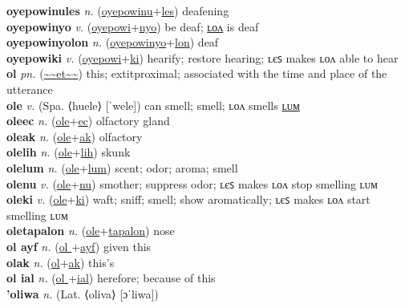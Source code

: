 \textbf{oyepowinules} \textit{n.} (\hyperref[oyepowinu]{oyepowinu}+\hyperref[les]{les})
deafening \label{oyepowinules} \\
\textbf{oyepowinyo} \textit{v.} (\hyperref[oyepowi]{oyepowi}+\hyperref[nyo]{nyo})
be deaf; \hyperref[oyepowinyolon]{ʟᴏᴧ} is deaf \label{oyepowinyo} \\
\textbf{oyepowinyolon} \textit{n.} (\hyperref[oyepowinyo]{oyepowinyo}+\hyperref[lon]{lon})
deaf \label{oyepowinyolon} \\
\textbf{oyepowiki} \textit{v.} (\hyperref[oyepowi]{oyepowi}+\hyperref[ki]{ki})
hearify; restore hearing; ʟєꜱ makes ʟᴏᴧ able to hear \label{oyepowiki} \\
\textbf{ol} \textit{pn.} (\hyperref[et]{\~{}\~{}et\~{}\~{}})
this; 	extit{proximal}; associated with the time and place of the utterance \label{ol} \\
\textbf{ole} \textit{v.} (Spa. ⟨huele⟩ [ˈwele])
can smell; smell; ʟᴏᴧ smells \hyperref[olelum]{ʟᴜᴍ} \label{ole} \\
\textbf{oleec} \textit{n.} (\hyperref[ole]{ole}+\hyperref[ec]{ec})
olfactory gland \label{oleec} \\
\textbf{oleak} \textit{n.} (\hyperref[ole]{ole}+\hyperref[ak]{ak})
olfactory \label{oleak} \\
\textbf{olelih} \textit{n.} (\hyperref[ole]{ole}+\hyperref[lih]{lih})
skunk \label{olelih} \\
\textbf{olelum} \textit{n.} (\hyperref[ole]{ole}+\hyperref[lum]{lum})
scent; odor; aroma; smell \label{olelum} \\
\textbf{olenu} \textit{v.} (\hyperref[ole]{ole}+\hyperref[nu]{nu})
smother; suppress odor; ʟєꜱ makes ʟᴏᴧ stop smelling ʟᴜᴍ \label{olenu} \\
\textbf{oleki} \textit{v.} (\hyperref[ole]{ole}+\hyperref[ki]{ki})
waft; sniff; smell; show aromatically; ʟєꜱ makes ʟᴏᴧ start smelling ʟᴜᴍ \label{oleki} \\
\textbf{oletapalon} \textit{n.} (\hyperref[ole]{ole}+\hyperref[tapalon]{tapalon})
nose \label{oletapalon} \\
\textbf{ol ayf} \textit{n.} (\hyperref[ol ]{ol }+\hyperref[yf]{ayf})
given this \label{ol ayf} \\
\textbf{olak} \textit{n.} (\hyperref[ol]{ol}+\hyperref[ak]{ak})
this's \label{olak} \\
\textbf{ol ial} \textit{n.} (\hyperref[ol ]{ol }+\hyperref[al]{ial})
herefore; because of this \label{ol ial} \\
\textbf{'oliwa} \textit{n.} (Lat. ⟨oliva⟩ [ɔˈliwa])
